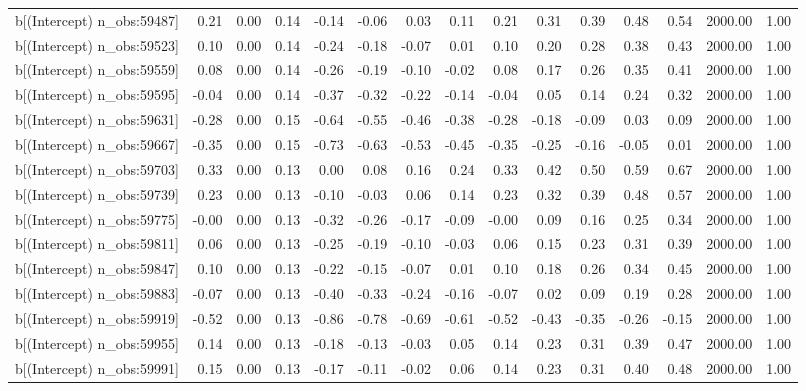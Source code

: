 \begin{table}[ht]
\begin{tabular}{rrrrrrrrrrrrrrr}
  b[(Intercept) n\_obs:59487] & 0.21 & 0.00 & 0.14 & -0.14 & -0.06 & 0.03 & 0.11 & 0.21 & 0.31 & 0.39 & 0.48 & 0.54 & 2000.00 & 1.00 \\ 
  b[(Intercept) n\_obs:59523] & 0.10 & 0.00 & 0.14 & -0.24 & -0.18 & -0.07 & 0.01 & 0.10 & 0.20 & 0.28 & 0.38 & 0.43 & 2000.00 & 1.00 \\ 
  b[(Intercept) n\_obs:59559] & 0.08 & 0.00 & 0.14 & -0.26 & -0.19 & -0.10 & -0.02 & 0.08 & 0.17 & 0.26 & 0.35 & 0.41 & 2000.00 & 1.00 \\ 
  b[(Intercept) n\_obs:59595] & -0.04 & 0.00 & 0.14 & -0.37 & -0.32 & -0.22 & -0.14 & -0.04 & 0.05 & 0.14 & 0.24 & 0.32 & 2000.00 & 1.00 \\ 
  b[(Intercept) n\_obs:59631] & -0.28 & 0.00 & 0.15 & -0.64 & -0.55 & -0.46 & -0.38 & -0.28 & -0.18 & -0.09 & 0.03 & 0.09 & 2000.00 & 1.00 \\ 
  b[(Intercept) n\_obs:59667] & -0.35 & 0.00 & 0.15 & -0.73 & -0.63 & -0.53 & -0.45 & -0.35 & -0.25 & -0.16 & -0.05 & 0.01 & 2000.00 & 1.00 \\ 
  b[(Intercept) n\_obs:59703] & 0.33 & 0.00 & 0.13 & 0.00 & 0.08 & 0.16 & 0.24 & 0.33 & 0.42 & 0.50 & 0.59 & 0.67 & 2000.00 & 1.00 \\ 
  b[(Intercept) n\_obs:59739] & 0.23 & 0.00 & 0.13 & -0.10 & -0.03 & 0.06 & 0.14 & 0.23 & 0.32 & 0.39 & 0.48 & 0.57 & 2000.00 & 1.00 \\ 
  b[(Intercept) n\_obs:59775] & -0.00 & 0.00 & 0.13 & -0.32 & -0.26 & -0.17 & -0.09 & -0.00 & 0.09 & 0.16 & 0.25 & 0.34 & 2000.00 & 1.00 \\ 
  b[(Intercept) n\_obs:59811] & 0.06 & 0.00 & 0.13 & -0.25 & -0.19 & -0.10 & -0.03 & 0.06 & 0.15 & 0.23 & 0.31 & 0.39 & 2000.00 & 1.00 \\ 
  b[(Intercept) n\_obs:59847] & 0.10 & 0.00 & 0.13 & -0.22 & -0.15 & -0.07 & 0.01 & 0.10 & 0.18 & 0.26 & 0.34 & 0.45 & 2000.00 & 1.00 \\ 
  b[(Intercept) n\_obs:59883] & -0.07 & 0.00 & 0.13 & -0.40 & -0.33 & -0.24 & -0.16 & -0.07 & 0.02 & 0.09 & 0.19 & 0.28 & 2000.00 & 1.00 \\ 
  b[(Intercept) n\_obs:59919] & -0.52 & 0.00 & 0.13 & -0.86 & -0.78 & -0.69 & -0.61 & -0.52 & -0.43 & -0.35 & -0.26 & -0.15 & 2000.00 & 1.00 \\ 
  b[(Intercept) n\_obs:59955] & 0.14 & 0.00 & 0.13 & -0.18 & -0.13 & -0.03 & 0.05 & 0.14 & 0.23 & 0.31 & 0.39 & 0.47 & 2000.00 & 1.00 \\ 
  b[(Intercept) n\_obs:59991] & 0.15 & 0.00 & 0.13 & -0.17 & -0.11 & -0.02 & 0.06 & 0.14 & 0.23 & 0.31 & 0.40 & 0.48 & 2000.00 & 1.00 \\ 

\end{tabular}
\end{table}

